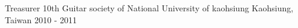 

\begin{cventries}

  \cventry
  {Treasurer} %
  {10th Guitar society of National University of kaohsiung} %
    {Kaohsiung, Taiwan} %
    {2010 -  2011} %
    {
    }

\end{cventries}
